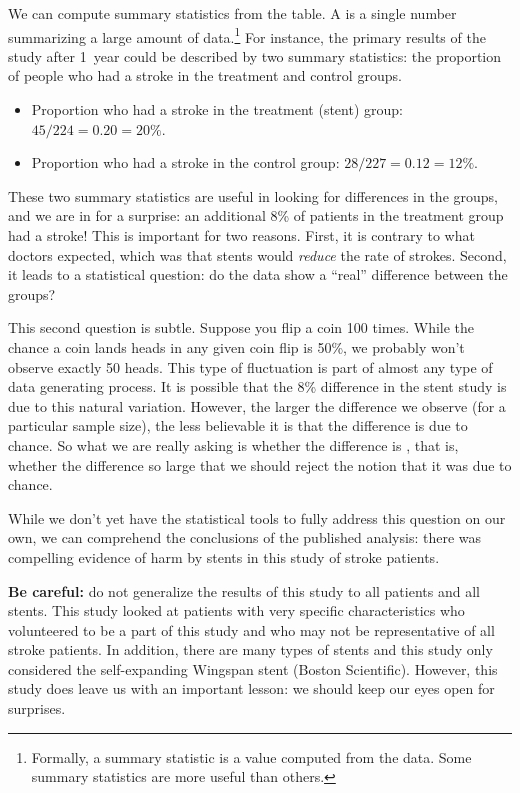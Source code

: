 We can compute summary statistics from the table. A  is a single number summarizing a large amount of data.\footnote{Formally, a summary statistic is a value computed from the data. Some summary statistics are more useful than others.} For instance, the primary results of the study after 1~year could be described by two summary statistics: the proportion of people who had a stroke in the treatment and control groups.
\begin{itemize}
\setlength{\itemsep}{0mm}
\item[] Proportion who had a stroke in the treatment (stent) group: $45/224 = 0.20 = 20\%$.
\item[] Proportion who had a stroke in the control group: $28/227 = 0.12 = 12\%$.
\end{itemize}
These two summary statistics are useful in looking for differences in the groups, and we are in for a surprise: an additional 8\% of patients in the treatment group had a stroke! This is important for two reasons. First, it is contrary to what doctors expected, which was that stents would \emph{reduce} the rate of strokes. Second, it leads to a statistical question: do the data show a ``real'' difference between the groups?

\D{\newpage}

This second question is subtle. Suppose you flip a coin 100 times. While the chance a coin lands heads in any given coin flip is 50\%, we probably won't observe exactly 50 heads. This type of fluctuation is part of almost any type of data generating process. It is possible that the 8\% difference in the stent study is due to this natural variation. However, the larger the difference we observe (for a particular sample size), the less believable it is that the difference is due to chance. So what we are really asking is whether the difference is , that is, whether the difference so large that we should reject the notion that it was due to chance. 

While we don't yet have the statistical tools to fully address this question on our own, we can comprehend the conclusions of the published analysis: there was compelling evidence of harm by stents in this study of stroke patients.

\textbf{Be careful:} do not generalize the results of this study to all patients and all stents. This study looked at patients with very specific characteristics who volunteered to be a part of this study and who may not be representative of all stroke patients. In addition, there are many types of stents and this study only considered the self-expanding Wingspan stent (Boston Scientific). However, this study does leave us with an important lesson: we should keep our eyes open for surprises.

